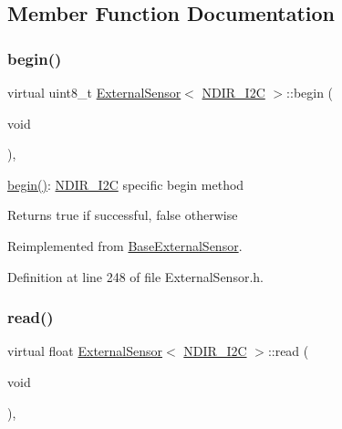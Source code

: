 \subsection{Member Function Documentation}
\mbox{\label{class_external_sensor_3_01_n_d_i_r___i2_c_01_4_ac6f3614d94968ef0cc11b2b4d69cef03}} 
\subsubsection{\texorpdfstring{begin()}{begin()}}
{\footnotesize\ttfamily virtual uint8\+\_\+t \hyperlink{class_external_sensor}{External\+Sensor}$<$ \hyperlink{class_n_d_i_r___i2_c}{N\+D\+I\+R\+\_\+\+I2C} $>$\+::begin (\begin{DoxyParamCaption}\item[{void}]{ }\end{DoxyParamCaption})\hspace{0.3cm}{\ttfamily [inline]}, {\ttfamily [virtual]}}

\hyperlink{class_external_sensor_3_01_n_d_i_r___i2_c_01_4_ac6f3614d94968ef0cc11b2b4d69cef03}{begin()}\+: \hyperlink{class_n_d_i_r___i2_c}{N\+D\+I\+R\+\_\+\+I2C} specific begin method

\begin{DoxyReturn}{Returns}
true if successful, false otherwise 
\end{DoxyReturn}


Reimplemented from \hyperlink{class_base_external_sensor_a87d132803d4f4fdd4e66332809f0c9a0}{Base\+External\+Sensor}.



Definition at line 248 of file External\+Sensor.\+h.

\mbox{\label{class_external_sensor_3_01_n_d_i_r___i2_c_01_4_a239d18652e9fb4673842ae9726edf44f}} 
\subsubsection{\texorpdfstring{read()}{read()}}
{\footnotesize\ttfamily virtual float \hyperlink{class_external_sensor}{External\+Sensor}$<$ \hyperlink{class_n_d_i_r___i2_c}{N\+D\+I\+R\+\_\+\+I2C} $>$\+::read (\begin{DoxyParamCaption}\item[{void}]{ }\end{DoxyParamCaption})\hspace{0.3cm}{\ttfamily [inline]}, {\ttfamily [virtual]}}

